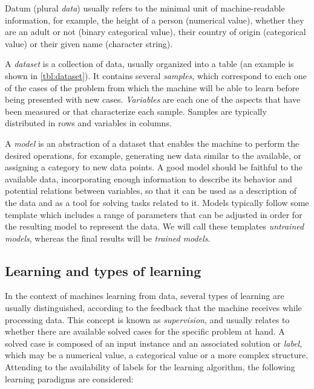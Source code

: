 Datum (plural \textit{data}) usually refers to the minimal unit of machine-readable information, for example, the height of a person (numerical value), whether they are an adult or not (binary categorical value), their country of origin (categorical value) or their given name (character string).

A \textit{dataset} is a collection of data, usually organized into a table (an example is shown in \autoref{tbl:dataset}). It contains several \textit{samples}, which correspond to each one of the cases of the problem from which the machine will be able to learn before being presented with new cases. \textit{Variables} are each one of the aspects that have been measured or that characterize each sample. Samples are typically distributed in rows and variables in columns.


A \textit{model} is an abstraction of a dataset that enables the machine to perform the desired operations, for example, generating new data similar to the available, or assigning a category to new data points. A good model should be faithful to the available data, incorporating enough information to describe its behavior and potential relations between variables, so that it can be used as a description of the data and as a tool for solving tasks related to it. Models typically follow some template which includes a range of parameters that can be adjusted in order for the resulting model to represent the data. We will call these templates \textit{untrained models}, whereas the final results will be \textit{trained models}.



\subsection{Learning and types of learning}

In the context of machines learning from data, several types of learning are usually distinguished, according to the feedback that the machine receives while processing data. This concept is known as \textit{supervision}, and usually relates to whether there are available solved cases for the specific problem at hand. A solved case is composed of an input instance and an associated solution or \textit{label}, which may be a numerical value, a categorical value or a more complex structure. Attending to the availability of labels for the learning algorithm, the following learning paradigms are considered:
 
